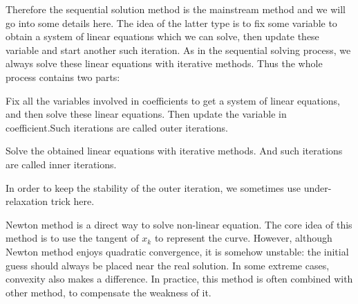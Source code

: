 \documentclass[english, nochinese]{pkupaper}
\begin{document}
Therefore the sequential solution method is the mainstream method and we will go into some details here. The idea of the latter type is to fix some variable to obtain a system of linear equations which we can solve, then update these variable and start another such iteration. As in the sequential solving process, we always solve these linear equations with iterative methods. Thus the whole process contains two parts:
\begin{partlist}
\item Fix all the variables involved in coefficients to get a system of linear equations, and then solve these linear equations. Then update the variable in coefficient.Such iterations are called outer iterations.
\item Solve the obtained linear equations with iterative methods. And such iterations are called inner iterations.
\end{partlist}
In order to keep the stability of the outer iteration, we sometimes use under-relaxation trick here.




Newton method is a direct way to solve non-linear equation. The core idea of this method is to use the tangent of $x_k$ to represent the curve. 
However, although Newton method enjoys quadratic convergence, it is somehow unstable: the initial guess should always be placed near the real solution. In some extreme cases, convexity also makes a difference.
In practice, this method is often combined with other method, to compensate the weakness of it.
\end{document}
